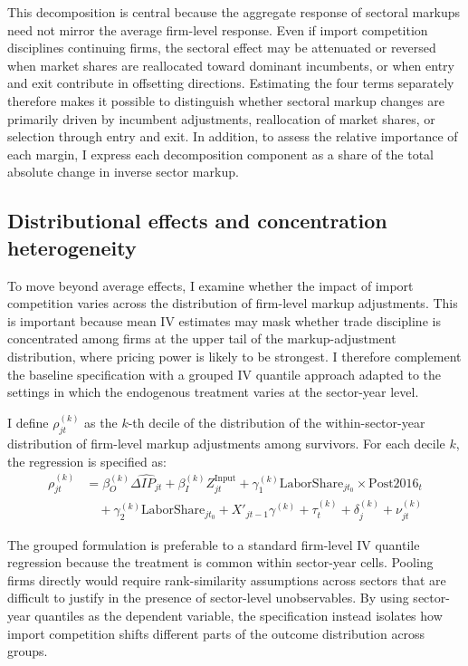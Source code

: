 \documentclass[12pt]{article}
\begin{document}
This decomposition is central because the aggregate response of sectoral markups need not mirror the average firm-level response. Even if import competition disciplines continuing firms, the sectoral effect may be attenuated or reversed when market shares are reallocated toward dominant incumbents, or when entry and exit contribute in offsetting directions. Estimating the four terms separately therefore makes it possible to distinguish whether sectoral markup changes are primarily driven by incumbent adjustments, reallocation of market shares, or selection through entry and exit. In addition, to assess the relative importance of each margin, I express each decomposition component as a share of the total absolute change in inverse sector markup. 

\subsection{Distributional effects and concentration heterogeneity}

To move beyond average effects, I examine whether the impact of import competition varies across the distribution of firm-level markup adjustments. This is important because mean IV estimates may mask whether trade discipline is concentrated among firms at the upper tail of the markup-adjustment distribution, where pricing power is likely to be strongest. I therefore complement the baseline specification with a grouped IV quantile approach \textcite{chetverikovIVQuantileRegression2016} adapted to the settings in which the endogenous treatment varies at the sector-year level. 

I define $\rho_{jt}^{(k)}$ as the $k$-th decile of the distribution of the within-sector-year distribution of firm-level markup adjustments among survivors. For each decile $k$, the regression is specified as:
\begin{equation}
\begin{aligned}
\rho_{jt}^{(k)} &= \beta_O^{(k)} \widehat{\Delta IP_{jt}} + \beta_I^{(k)} Z_{jt}^{\text{Input}} + \gamma_1^{(k)} \text{LaborShare}_{jt_0} \times \text{Post2016}_t \\
&\quad + \gamma_2^{(k)} \text{LaborShare}_{jt_0} + X'_{jt-1} \gamma^{(k)} + \tau_t^{(k)} + \delta_j^{(k)} + \nu_{jt}^{(k)}
\end{aligned}
\end{equation}

The grouped formulation is preferable to a standard firm-level IV quantile regression because the treatment is common within sector-year cells. Pooling firms directly would require rank-similarity assumptions across sectors that are difficult to justify in the presence of sector-level unobservables. By using sector-year quantiles as the dependent variable, the specification instead isolates how import competition shifts different parts of the outcome distribution across groups. 
\end{document}

